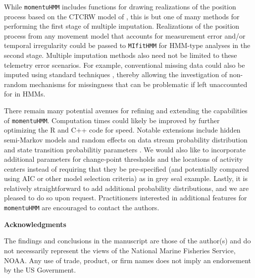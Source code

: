 \documentclass[12pt]{article}
\begin{document}
While \verb|momentuHMM| includes functions for drawing realizations of the position process based on the CTCRW model of \cite{JohnsonEtAl2008}, this is but one of many methods for performing the first stage of multiple imputation. Realizations of the position process from any movement model that accounts for measurement error and/or temporal irregularity \citep[e.g.][]{CalabreseEtAl2016,GurarieEtAl2017} could be passed to \verb|MIfitHMM| for HMM-type analyses in the second stage. Multiple imputation methods also need not be limited to these telemetry error scenarios. For example, conventional missing data could also be imputed using standard techniques \citep{RubinSchenker1986}, thereby allowing the investigation of non-random mechanisms for missingness that can be problematic if left unaccounted for in HMMs.

There remain many potential avenues for refining and extending the capabilities of \verb|momentuHMM|. Computation times could likely be improved by further optimizing the R and C++ code for speed. Notable extensions include hidden semi-Markov models and random effects on data stream probability distribution and state transition probabilitiy parameters \citep{ZucchiniEtAl2016}. We would also like to incorporate additional parameters for change-point thresholds and the locations of activity centers instead of requiring that they be pre-specified (and potentially compared using AIC or other model selection criteria) as in grey seal example. Lastly, it is relatively straightforward to add additional probability distributions, and we are pleased to do so upon request. Practitioners interested in additional features for \verb|momentuHMM| are encouraged to contact the authors.

\noindent \textbf{Acknowledgments} 

\noindent The findings and conclusions in the manuscript are those of the author(s) and do not necessarily represent the views of the National Marine Fisheries Service, NOAA. Any use of trade, product, or firm names does not imply an endorsement by the US Government.




\clearpage
\end{document}
